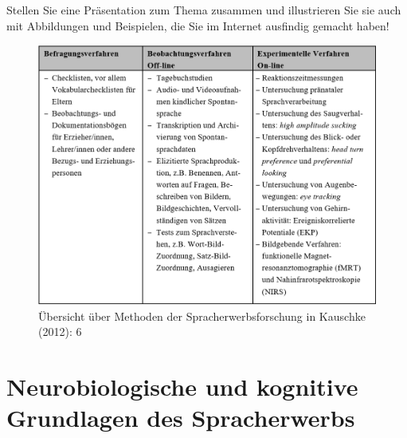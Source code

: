 \documentclass[
  letterpaper,
]{scrbook}
\begin{document}
Stellen Sie eine Präsentation zum Thema zusammen und illustrieren Sie
sie auch mit Abbildungen und Beispielen, die Sie im Internet ausfindig
gemacht haben!

\begin{figure}

{\centering \includegraphics[width=1\textwidth,height=\textheight]{./pictures/methoden.png}

}

\caption{Übersicht über Methoden der Spracherwerbsforschung in Kauschke
(2012): 6}

\end{figure}

\hypertarget{sec-neuro}{%
\chapter{Neurobiologische und kognitive Grundlagen des
Spracherwerbs}\label{sec-neuro}}
\end{document}
